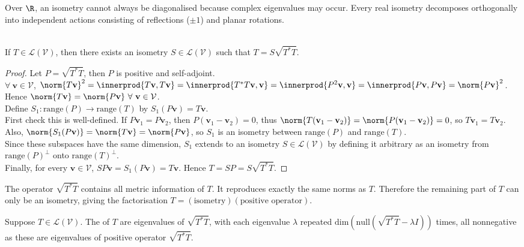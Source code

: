 Over $\R$, an isometry cannot always be diagonalised because complex eigenvalues may occur. Every real isometry decomposes orthogonally into independent actions consisting of reflections ($\pm 1$) and planar rotations.

\begin{theorem} \label{thm:polardecomposition} \\
If $T \in \mathcal{L}(\mathcal{V})$, then there exists an isometry $S \in \mathcal{L}(\mathcal{V})$ such that $T = S \sqrt{T^* T}$.
\begin{proof} Let $P = \sqrt{T^* T}$, then $P$ is positive and self-adjoint.\\
$\forall \ \mathbf{v} \in \mathcal{V}$, $\norm{T \mathbf{v}}^2 = \innerprod{T \mathbf{v}, T \mathbf{v}} = \innerprod{T^* T \mathbf{v}, \mathbf{v}} = \innerprod{P^2 \mathbf{v}, \mathbf{v}} = \innerprod{P \mathbf{v}, P \mathbf{v}} = \norm{P \mathbf{v}}^2$. Hence $\norm{T \mathbf{v}} = \norm{P \mathbf{v}} \ \forall \ \mathbf{v} \in \mathcal{V}$.\\
Define $S_1: \text{range}(P) \rightarrow \text{range}(T)$ by $S_1 (P \mathbf{v}) = T \mathbf{v}$.\\
First check this is well-defined. If $P \mathbf{v}_1 = P \mathbf{v}_2$, then $P(\mathbf{v}_1 - \mathbf{v}_2) = 0$, thus $\norm{T(\mathbf{v}_1 - \mathbf{v}_2)} = \norm{P(\mathbf{v}_1 - \mathbf{v}_2)} = 0$, so $T \mathbf{v}_1 = T \mathbf{v}_2$. Also, $\norm{S_1 (P \mathbf{v})} = \norm{T \mathbf{v}} = \norm{P \mathbf{v}}$, so $S_1$ is an isometry between $\text{range}(P)$ and $\text{range}(T)$.\\
Since these subspaces have the same dimension, $S_1$ extends to an isometry $S \in \mathcal{L}(\mathcal{V})$ by defining it arbitrary as an isometry from $\text{range}(P)^{\perp}$ onto $\text{range}(T)^{\perp}$.\\
Finally, for every $\mathbf{v} \in \mathcal{V}$, $SP\mathbf{v} = S_1 (P \mathbf{v}) = T \mathbf{v}$. Hence $T = SP = S \sqrt{T^* T}$.
\end{proof}
\end{theorem}

The operator $\sqrt{T^*T}$ contains all metric information of $T$. It reproduces exactly the same norms as $T$. Therefore the remaining part of $T$ can only be an isometry, giving the factorisation $T = (\text{isometry})(\text{positive operator})$.

\begin{definition} Suppose $T \in \mathcal{L}(\mathcal{V})$. The  of $T$ are eigenvalues of $\sqrt{T^*T}$, with each eigenvalue $\lambda$ repeated $\text{dim}(\text{null}(\sqrt{T^*T} - \lambda I))$ times, all nonnegative as these are eigenvalues of positive operator $\sqrt{T^*T}$.
\end{definition}

